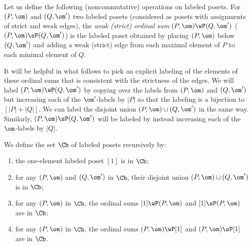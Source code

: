 Let us define the following (noncommutative) operations on labeled posets.
For $(P,\om)$ and $(Q,\om')$ two labeled posets (considered as posets with assignments of strict and weak edges),
the \emph{weak (\resp strict) ordinal sum} $(P,\om)\wP (Q,\om')$ (\resp $(P,\om)\sP (Q,\om')$) is the labeled poset obtained 
by placing $(P,\om)$ below $(Q,\om')$ 
and adding a weak (\resp strict) edge from each maximal element of $P$ to each minimal element of $Q$.  

It will be helpful in what follows to pick an explicit labeling of the elements of these ordinal sums that is consistent with the strictness of the edges.  We will label $(P,\om)\wP (Q,\om')$ by copying over the labels from $(P,\om)$ and $(Q,\om')$ but increasing each of the $\om'$-labels by $|P|$ so that the labeling is a bijection to $[|P|+|Q|]$.  We can label the disjoint union $(P,\om)\sqcup (Q,\om')$ in the same way.  Similarly, $(P,\om)\sP (Q,\om')$ will be labeled by instead increasing each of the $\om$-labels by $|Q|$.

\begin{definition}\label{def:C}
We define the set $\Cb$ of labeled posets recursively by:
\begin{enumerate}[label=(\alph*)]
\item\label{it42a} the one-element labeled poset $[1]$ is in $\Cb$;
\item \label{it42b} for any $(P,\om)$ and $(Q,\om')$ in $\Cb$, their disjoint union $(P,\om)\sqcup (Q,\om')$ is in $\Cb$;
\item \label{it42c} for any $(P,\om)$ in $\Cb$, the ordinal sums
$[1]\wP (P,\om)$ and $[1]\sP (P,\om)$
are in $\Cb$;
\item \label{it42d} for any $(P,\om)$ in $\Cb$, the ordinal sums
$(P,\om)\wP [1]$ and $(P,\om)\sP [1]$ 
are in $\Cb$.
\end{enumerate} 
\end{definition}
